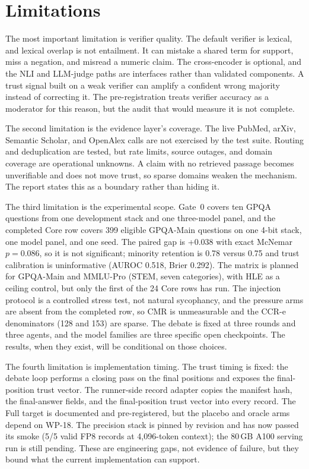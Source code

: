 \section{Limitations}\label{sec:conclusion-limitations}

The most important limitation is verifier quality. The default verifier is lexical, and lexical overlap is not entailment. It can mistake a shared term for support, miss a negation, and misread a numeric claim. The cross-encoder is optional, and the NLI and LLM-judge paths are interfaces rather than validated components. A trust signal built on a weak verifier can amplify a confident wrong majority instead of correcting it. The pre-registration treats verifier accuracy as a moderator for this reason, but the audit that would measure it is not complete.

The second limitation is the evidence layer's coverage. The live PubMed, arXiv, Semantic Scholar, and OpenAlex calls are not exercised by the test suite. Routing and deduplication are tested, but rate limits, source outages, and domain coverage are operational unknowns. A claim with no retrieved passage becomes unverifiable and does not move trust, so sparse domains weaken the mechanism. The report states this as a boundary rather than hiding it.

The third limitation is the experimental scope. Gate~0 covers ten GPQA questions from one development stack and one three-model panel, and the completed Core row covers 399 eligible GPQA-Main questions on one 4-bit stack, one model panel, and one seed. The paired gap is +0.038 with exact McNemar $p=0.086$, so it is not significant; minority retention is 0.78 versus 0.75 and trust calibration is uninformative (AUROC 0.518, Brier 0.292). The matrix is planned for GPQA-Main and MMLU-Pro (STEM, seven categories), with HLE as a ceiling control, but only the first of the 24 Core rows has run. The injection protocol is a controlled stress test, not natural sycophancy, and the pressure arms are absent from the completed row, so CMR is unmeasurable and the CCR-e denominators (128 and 153) are sparse. The debate is fixed at three rounds and three agents, and the model families are three specific open checkpoints. The results, when they exist, will be conditional on those choices.

The fourth limitation is implementation timing. The trust timing is fixed: the debate loop performs a closing pass on the final positions and exposes the final-position trust vector. The runner-side record adapter copies the manifest hash, the final-answer fields, and the final-position trust vector into every record. The Full target is documented and pre-registered, but the placebo and oracle arms depend on WP-18. The precision stack is pinned by revision and has now passed its smoke (5/5 valid FP8 records at 4{,}096-token context); the 80\,GB A100 serving run is still pending. These are engineering gaps, not evidence of failure, but they bound what the current implementation can support.

